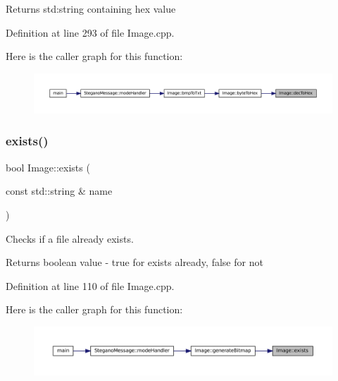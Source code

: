 \begin{DoxyReturn}{Returns}
std\+:string containing hex value 
\end{DoxyReturn}


Definition at line 293 of file Image.\+cpp.

Here is the caller graph for this function\+:\nopagebreak
\begin{figure}[H]
\begin{center}
\leavevmode
\includegraphics[width=350pt]{classImage_a26f7e0b2649e2529df7e7aea46f2da4a_icgraph}
\end{center}
\end{figure}
\mbox{\label{classImage_a83d7183bfcd632649c36504d9ab07e36}} 
\subsubsection{\texorpdfstring{exists()}{exists()}}
{\footnotesize\ttfamily bool Image\+::exists (\begin{DoxyParamCaption}\item[{const std\+::string \&}]{name }\end{DoxyParamCaption})\hspace{0.3cm}{\ttfamily [protected]}}



Checks if a file already exists. 

\begin{DoxyReturn}{Returns}
boolean value -\/ true for exists already, false for not 
\end{DoxyReturn}


Definition at line 110 of file Image.\+cpp.

Here is the caller graph for this function\+:\nopagebreak
\begin{figure}[H]
\begin{center}
\leavevmode
\includegraphics[width=350pt]{classImage_a83d7183bfcd632649c36504d9ab07e36_icgraph}
\end{center}
\end{figure}
\mbox{\label{classImage_a3ca1ae6c1eb2846bfba066b01e6020e1}} 

